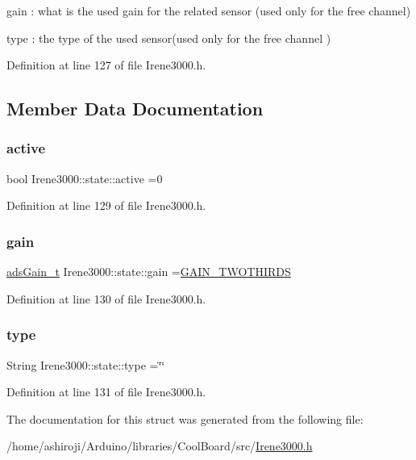 gain \+: what is the used gain for the related sensor (used only for the free channel)

type \+: the type of the used sensor(used only for the free channel ) 

Definition at line 127 of file Irene3000.\+h.



\subsection{Member Data Documentation}
\mbox{\label{struct_irene3000_1_1state_a879828ace7e7a7bc91ff703bfee36599}} 
\subsubsection{\texorpdfstring{active}{active}}
{\footnotesize\ttfamily bool Irene3000\+::state\+::active =0}



Definition at line 129 of file Irene3000.\+h.

\mbox{\label{struct_irene3000_1_1state_a1ecf69d38cb31ecaf6b3602a3f3e93cb}} 
\subsubsection{\texorpdfstring{gain}{gain}}
{\footnotesize\ttfamily \hyperlink{_cool_adafruit___a_d_s1015_8h_a3d6c0e15829a207b9155890811fa4781}{ads\+Gain\+\_\+t} Irene3000\+::state\+::gain =\hyperlink{_cool_adafruit___a_d_s1015_8h_a3d6c0e15829a207b9155890811fa4781a879d688347ec0bf159fe1278db602f68}{G\+A\+I\+N\+\_\+\+T\+W\+O\+T\+H\+I\+R\+DS}}



Definition at line 130 of file Irene3000.\+h.

\mbox{\label{struct_irene3000_1_1state_a9897a7e02727db6351d44006eec73799}} 
\subsubsection{\texorpdfstring{type}{type}}
{\footnotesize\ttfamily String Irene3000\+::state\+::type =\char`\"{}\char`\"{}}



Definition at line 131 of file Irene3000.\+h.



The documentation for this struct was generated from the following file\+:\begin{DoxyCompactItemize}
\item 
/home/ashiroji/\+Arduino/libraries/\+Cool\+Board/src/\hyperlink{_irene3000_8h}{Irene3000.\+h}\end{DoxyCompactItemize}
